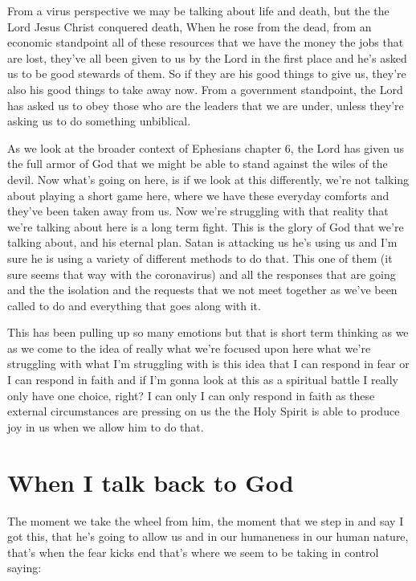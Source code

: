 \documentclass[11pt]{article} %
\begin{document}
From a virus perspective we may be talking about life and death, but the the Lord Jesus Christ
conquered death, When he rose from the dead, from an economic standpoint all of these
resources that we have the money the jobs that are lost, they've all been given to us by the
Lord in the first place and he's asked us to be good stewards of them. So if they are his
good things to give us, they're also his good things to take away now. From a government
standpoint, the Lord has asked us to obey those who are the leaders that we are under,
unless they're asking us to do something unbiblical.

As we look at the broader context of Ephesians chapter 6, the Lord has given us the full
armor of God that we might be able to stand against the wiles of the devil. Now what's going
on here, is if we look at this differently, we're not talking about playing a short game here,
where we have these everyday comforts and they've been taken away from us. Now we're
struggling with that reality that we're talking about here is a long term fight. This is the
glory of God that we're talking about, and his eternal plan. Satan is attacking us he's
using us and I'm sure he is using a variety of different methods to do that. This one
of them (it sure seems that way with the coronavirus) and all the responses that are
going and the the isolation and the requests that we not meet together as we've been
called to do and everything that goes along with it.

This has been pulling up so many emotions but that is short term thinking as we as we
come to the idea of really what we're focused upon here what we're struggling with what
I'm struggling with is this idea that I can respond in fear or I can respond in faith and if
I'm gonna look at this as a spiritual battle I really only have one choice, right? I can only
I can only respond in faith as these external circumstances are pressing on us the the Holy
Spirit is able to produce joy in us when we allow him to do that.

\section{When I talk back to God}

The moment we take the wheel from him, the moment that we step in and say I got this,
that he's going to allow us and in our humaneness in our human nature, that's when the
fear kicks end that's where we seem to be taking in control saying:
\end{document}
